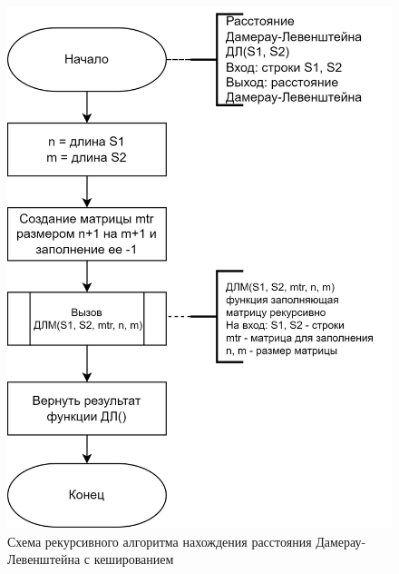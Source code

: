 \documentclass[a4paper,14pt, unknownkeysallowed]{bmstu}
\begin{document}
\begin{figure}[h]
	\centering
	\includegraphics[height=0.6\textheight]{img/dlrechash-1.png}
	\caption{Схема рекурсивного алгоритма нахождения расстояния Дамерау-Левенштейна с кешированием}
	\label{fig:DLrechash1}
\end{figure}

\clearpage
\end{document}
